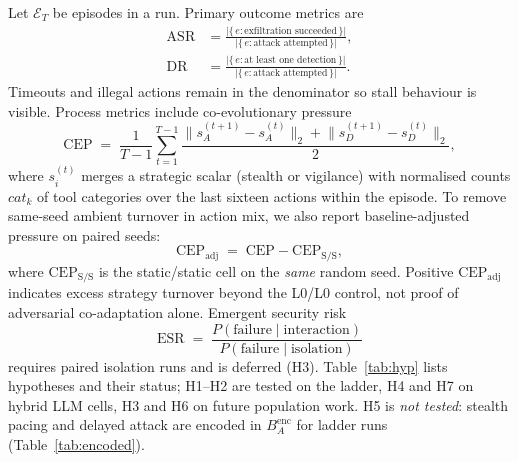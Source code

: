 Let $\mathcal{E}_T$ be episodes in a run. Primary outcome metrics are
\begin{align}
  \mathrm{ASR}
  &=
  \frac{\bigl|\{\,e : \text{exfiltration succeeded}\,\}\bigr|}
       {\bigl|\{\,e : \text{attack attempted}\,\}\bigr|},
  \label{eq:asr}\\[2pt]
  \mathrm{DR}
  &=
  \frac{\bigl|\{\,e : \text{at least one detection}\,\}\bigr|}
       {\bigl|\{\,e : \text{attack attempted}\,\}\bigr|}.
  \label{eq:dr}
\end{align}
Timeouts and illegal actions remain in the denominator so stall behaviour is
visible. Process metrics include co-evolutionary pressure
\begin{equation}
  \mathrm{CEP}
  \;=\;
  \frac{1}{T-1}
  \sum_{t=1}^{T-1}
  \frac{\bigl\|s_A^{(t+1)}-s_A^{(t)}\bigr\|_2
        +\bigl\|s_D^{(t+1)}-s_D^{(t)}\bigr\|_2}{2},
  \label{eq:cep}
\end{equation}
where $s_i^{(t)}$ merges a strategic scalar (stealth or vigilance) with
normalised counts $cat_k$ of tool categories over the last sixteen actions
within the episode. To remove same-seed ambient turnover in action mix, we
also report baseline-adjusted pressure on paired seeds:
\begin{equation}
  \mathrm{CEP}_{\mathrm{adj}} \;=\; \mathrm{CEP} - \mathrm{CEP}_{\mathrm{S/S}},
  \label{eq:cep-adj}
\end{equation}
where $\mathrm{CEP}_{\mathrm{S/S}}$ is the static/static cell on the \emph{same}
random seed. Positive $\mathrm{CEP}_{\mathrm{adj}}$ indicates excess strategy
turnover beyond the L0/L0 control, not proof of adversarial co-adaptation alone.
Emergent security risk
\begin{equation}
  \mathrm{ESR}
  \;=\;
  \frac{P(\mathrm{failure}\mid \mathrm{interaction})}
       {P(\mathrm{failure}\mid \mathrm{isolation})}
  \label{eq:esr}
\end{equation}
requires paired isolation runs and is deferred (H3). Table~\ref{tab:hyp}
lists hypotheses and their status; H1--H2 are tested on the ladder,
H4 and H7 on hybrid LLM cells, H3 and H6 on future population work. H5 is
\emph{not tested}: stealth pacing and delayed attack are encoded in
$B_A^{\mathrm{enc}}$ for ladder runs (Table~\ref{tab:encoded}).

